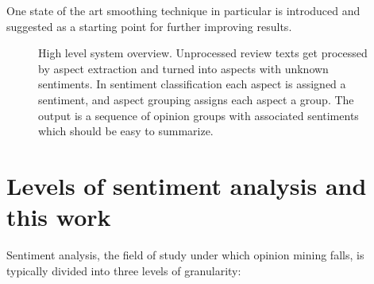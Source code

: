 \documentclass[a4paper,11pt]{kth-mag}
\begin{document}
One state of the art smoothing technique in particular is introduced and suggested as a starting point
for further improving results.

\begin{figure}[t]
  \centering
  \caption{High level system overview. Unprocessed review texts get processed by aspect extraction and turned into
    aspects with unknown sentiments. In sentiment classification each aspect is assigned a sentiment, and aspect grouping assigns each aspect a group. The output is a sequence of opinion groups with associated sentiments which should be easy to summarize.}
  \label{fig:overview}
\end{figure}


\clearpage

\newpage
\section{Levels of sentiment analysis and this work}
Sentiment analysis, the field of study under which opinion mining falls,
is typically divided into three levels of granularity:
\end{document}
